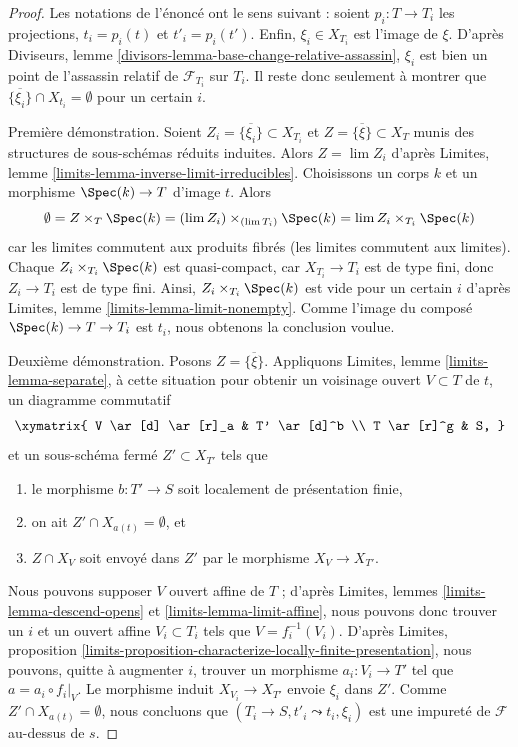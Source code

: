 \begin{proof}
Les notations de l'énoncé ont le sens suivant : soient $p_i : T \to T_i$
les projections, $t_i = p_i(t)$ et $t'_i = p_i(t')$.
Enfin, $\xi_i \in X_{T_i}$ est l'image de $\xi$. D'après
Diviseurs, lemme \ref{divisors-lemma-base-change-relative-assassin},
$\xi_i$ est bien un point de l'assassin
relatif de $\mathcal{F}_{T_i}$ sur $T_i$. Il reste donc seulement à
montrer que $\overline{\{\xi_i\}} \cap X_{t_i} = \emptyset$ pour un certain $i$.

\medskip\noindent
Première démonstration. Soient $Z_i = \overline{\{\xi_i\}} \subset X_{T_i}$
et $Z = \overline{\{\xi\}} \subset X_T$
munis des structures de sous-schémas réduits induites.
Alors $Z = \lim Z_i$ d'après
Limites, lemme \ref{limits-lemma-inverse-limit-irreducibles}.
Choisissons un corps $k$ et un morphisme $\Spec(k) \to T$ d'image $t$.
Alors
$$
\emptyset =
Z \times_T \Spec(k) = (\lim Z_i) \times_{(\lim T_i)} \Spec(k)
= \lim Z_i \times_{T_i} \Spec(k)
$$
car les limites commutent aux produits fibrés (les limites commutent aux limites).
Chaque $Z_i \times_{T_i} \Spec(k)$ est quasi-compact, car $X_{T_i} \to T_i$
est de type fini, donc $Z_i \to T_i$ est de type fini.
Ainsi, $Z_i \times_{T_i} \Spec(k)$ est vide pour un certain $i$ d'après
Limites, lemme \ref{limits-lemma-limit-nonempty}.
Comme l'image du composé $\Spec(k) \to T \to T_i$ est $t_i$,
nous obtenons la conclusion voulue.

\medskip\noindent
Deuxième démonstration. Posons $Z = \overline{\{\xi\}}$. Appliquons
Limites, lemme \ref{limits-lemma-separate},
à cette situation pour obtenir un voisinage ouvert
$V \subset T$ de $t$, un diagramme commutatif
$$
\xymatrix{
V \ar[d] \ar[r]_a & T' \ar[d]^b \\
T \ar[r]^g & S,
}
$$
et un sous-schéma fermé $Z' \subset X_{T'}$ tels que
\begin{enumerate}
\item le morphisme $b : T' \to S$ soit localement de présentation finie,
\item on ait $Z' \cap X_{a(t)} = \emptyset$, et
\item $Z \cap X_V$ soit envoyé dans $Z'$ par le morphisme $X_V \to X_{T'}$.
\end{enumerate}
Nous pouvons supposer $V$ ouvert affine de $T$ ; d'après
Limites, lemmes \ref{limits-lemma-descend-opens} et
\ref{limits-lemma-limit-affine},
nous pouvons donc trouver un $i$ et un ouvert affine $V_i \subset T_i$ tels que
$V = f_i^{-1}(V_i)$. D'après
Limites,
proposition \ref{limits-proposition-characterize-locally-finite-presentation},
nous pouvons, quitte à augmenter $i$, trouver un morphisme
$a_i : V_i \to T'$ tel que $a = a_i \circ f_i|_V$.
Le morphisme induit $X_{V_i} \to X_{T'}$ envoie $\xi_i$ dans
$Z'$. Comme $Z' \cap X_{a(t)} = \emptyset$, nous concluons que
$(T_i \to S, t'_i \leadsto t_i, \xi_i)$ est une impureté de
$\mathcal{F}$ au-dessus de $s$.
\end{proof}

